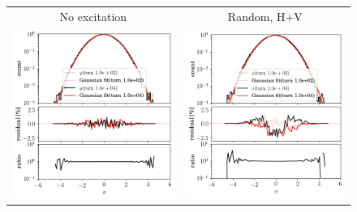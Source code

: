 \documentclass[aps
,prstab
,reprint
,longbibliography
,preprintnumbers
,showkeys
,amsfonts,amssymb,amsmath
,floatfix
]{revtex4-1}
\newlength{\bsrtwidth}
\begin{document}
\begin{figure}
  \begin{tabular}{cc}
    No excitation & Random, H+V \\
    \includegraphics[width=\bsrtwidth]{2016injerra2b2u_3_5um_hist_y.png} &
    \includegraphics[width=\bsrtwidth]{2016injerra2b2u_ranhv_3_5um_hist_x.png} \\

\end{tabular}
\end{figure}
\end{document}
